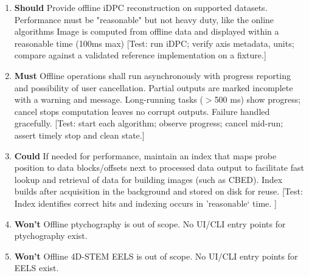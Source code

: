 \documentclass[12pt]{article}
\newcommand{\PriorityTag}[2]{%
  \colorbox{#2!25}{\footnotesize\textsf{\textbf{#1}}}\hspace{0.6em}}
\newcommand{\must}{\leavevmode\PriorityTag{Must}{green}}
\newcommand{\should}{\leavevmode\PriorityTag{Should}{yellow}}
\newcommand{\could}{\leavevmode\PriorityTag{Could}{cyan}}
\newcommand{\wont}{\leavevmode\PriorityTag{Won't}{red}}
\newcounter{reqgrp}[section] %
\newcounter{reqno}
\newcommand{\reqprefix}{GEN}
\newenvironment{requirements}[1]{%
  \renewcommand{\reqprefix}{#1}%
  \refstepcounter{reqgrp}%
  \setcounter{reqno}{0}%
  \begin{enumerate}[leftmargin=*]
}{\end{enumerate}}
\begin{document}
\begin{requirements}{OFR}
\item \should {}
  {Provide offline iDPC reconstruction on supported datasets. Performance must be "reasonable" but not heavy duty, like the online algorithms}
  {Image is computed from offline data and displayed within a reasonable time (100ms max)}  %
  [Test: run iDPC; verify axis metadata, units; compare against a validated reference implementation on a fixture.]

\item \must {}
  {Offline operations shall run asynchronously with progress reporting and possibility of user cancellation. Partial outputs are marked incomplete with a warning and message.}
  {Long-running tasks ($>$500 ms) show progress; cancel stops computation leaves no corrupt outputs. Failure handled gracefully.}
  [Test: start each algorithm; observe progress; cancel mid-run; assert timely stop and clean state.]

\item \could {}
  {If needed for performance, maintain an index that maps probe position to data blocks/offsets next to processed data output to facilitate fast lookup and retrieval of data for building images (such as CBED).}
  {Index builds after acquisition in the background and stored on disk for reuse. }
  [Test: Index identifies correct hits and indexing occurs in 'reasonable` time. ]

\item \wont {}
  {Offline ptychography is out of scope.}
  {No UI/CLI entry points for ptychography exist.}


\item \wont {}
  {Offline 4D-STEM EELS is out of scope.}
  {No UI/CLI entry points for EELS exist.}

\end{requirements}
\end{document}
